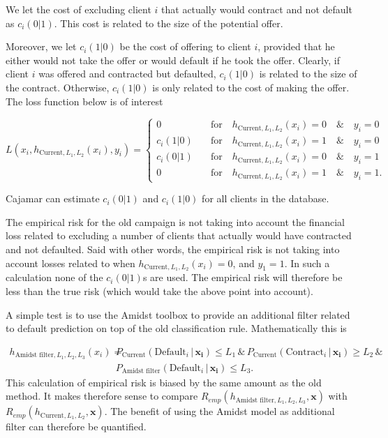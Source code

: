 \documentclass{article}
\theoremstyle{theorem}
\theoremstyle{definition}
\newcommand{\bv}[1]{\bm{#1}}
\begin{document}
We let the cost of excluding client $i$ that actually would contract and not default as $c_i(0|1)$.  This cost is related to the size of the potential offer.

Moreover, we let $c_i(1|0)$ be the cost of offering to client $i$, provided that he either would not take the offer or would default if he took the offer.  Clearly, if client $i$ was offered and contracted but defaulted, $c_i(1|0)$ is related to the size of the contract.  Otherwise, $c_i(1|0)$ is only related to the cost of making the offer.  The loss function below is of interest

\begin{equation}
\label{def:empRiskBank}
L(x_i, h_{\mbox{Current},L_1,L_2}(x_i) , y_i) = 
\begin{cases}
0     &\quad \mbox{for} \quad h_{\mbox{Current},L_1,L_2}(x_i) = 0 \quad \& \quad y_i = 0\\
c_i(1|0)    &\quad \mbox{for} \quad h_{\mbox{Current},L_1,L_2}(x_i) = 1 \quad \& \quad y_i = 0\\
c_i(0|1)      &\quad \mbox{for} \quad h_{\mbox{Current},L_1,L_2}(x_i) = 0 \quad \& \quad y_i = 1\\
0   &\quad \mbox{for} \quad h_{\mbox{Current},L_1,L_2}(x_i) = 1 \quad \& \quad y_i = 1.
\end{cases}
\end{equation}

Cajamar can estimate $c_i(0|1)$ and $c_i(1|0)$ for all clients in the database.


The empirical risk for the old campaign is not taking into account the financial loss related to excluding a number of clients that actually would have contracted and not defaulted.  Said with other words, the empirical risk is not taking into account losses related to when $h_{\mbox{Current},L_1,L_2}(x_i) = 0$, and $y_1 = 1$.  In such a calculation none of the $c_i(0|1)$s are used.  The empirical risk will therefore be less than the true risk (which would take the above point into account).

A simple test is to use the Amidst toolbox to provide an additional filter related to default prediction on top of the old classification rule.  Mathematically this is

\begin{equation}
\begin{split}
\label{eq:filter}
h_{\mbox{Amidst filter},L_1,L_2,L_3}(x_i) = &
P_{\mbox{Current}}(\mbox{Default}_i \,|\, \bv{x_i}) \leq L_1
 \, \& \,
P_{\mbox{Current}}(\mbox{Contract}_i \,|\, \bv{x_i}) \geq L_2
\, \& \,  
\\ &
P_{\mbox{Amidst filter}}(\mbox{Default}_i \,|\, \bv{x_i}) \leq L_3.
\end{split}
\end{equation}
This calculation of empirical risk is biased by the same amount as the old method.  It makes therefore sense to compare $R_{emp}(h_{\mbox{Amidst filter},L_1,L_2,L_3}, \bv{x}) $ with $R_{emp}(h_{\mbox{Current},L_1,L_2}, \bv{x}) $.
The benefit of using the Amidst model as additional filter can therefore be quantified.
\end{document}
